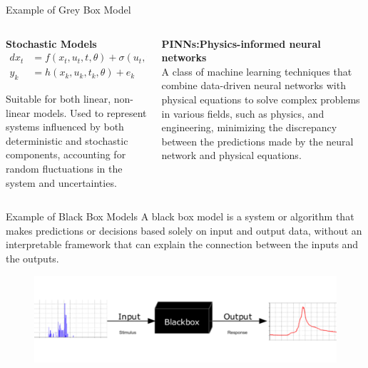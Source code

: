 \documentclass[aspectratio=169,hyperref={pdfpagelabels=false}]{beamer}
\begin{document}
\begin{frame}{Example of Grey Box Model}
  \begin{columns}
    \begin{column}{0.5\textwidth}
      \begin{tcolorbox}[width=1\linewidth, height = 1\linewidth]
      \textbf{Stochastic Models}
      \begin{align*}
        dx_t &= f(x_t, u_t, t, \theta) + \sigma(u_t, t, \theta)d\omega \\
        y_k  &= h(x_k, u_k, t_k, \theta) + e_k
      \end{align*}
    
      Suitable for both linear, non-linear models.  
      Used to represent systems influenced by both deterministic and stochastic components,
      accounting for random fluctuations in the system and uncertainties. \\
      \end{tcolorbox}\pause 

    \end{column}
    \begin{column}{0.5\textwidth}
      \begin{tcolorbox}[width=1\linewidth, height = 1\linewidth]
        \textbf{PINNs:Physics-informed neural networks} \\
        A class of machine learning techniques that combine data-driven neural
        networks with physical equations to solve complex problems in various fields,
        such as physics, and engineering, minimizing the discrepancy between the predictions made by the neural network and physical equations.
        \end{tcolorbox}
    \end{column}
\end{columns} 
\end{frame}

\begin{frame}{Example of Black Box Models}
  A black box model is a system or algorithm that makes predictions or decisions based solely on input and output data,
  without an interpretable framework that can explain the connection between the inputs and the outputs.
  \begin{figure}
    \centering
    \includegraphics[scale=0.5]{img/pic10.png}
  \end{figure}
\end{frame}
\end{document}
